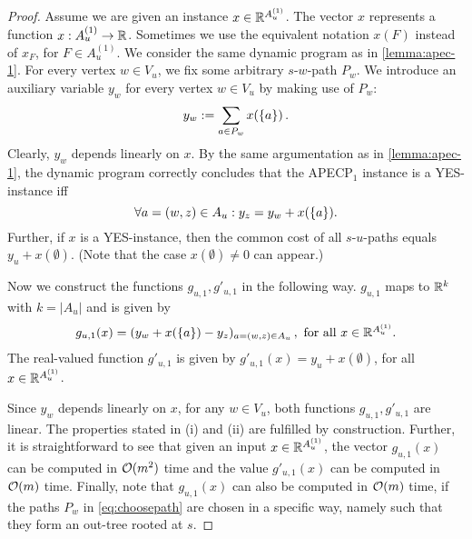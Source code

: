 \begin{proof}
    Assume we are given an instance $x \in \mathbb{R}^{A_u^{(1)}}$. The vector $x$ represents a function $x : A_u^{(1)} \rightarrow \mathbb{R}$. Sometimes we use the equivalent notation   $x(F)$ instead of $x_F$,  for $F\in A_u^{(1)}$. 
    We consider the same dynamic program as in \cref{lemma:apec-1}. For every vertex $w \in V_u$, we fix some arbitrary $s$-$w$-path $P_w$.
    We introduce an auxiliary  variable $y_w$ for every vertex $w \in V_u$ by making use of $P_w$:
    \begin{equation} 
    \label{eq:choosepath} y_w := \sum_{a \in P_w}x(\{ a \})\, .\end{equation}
    Clearly,  $y_w$ depends  linearly on $x$. By the same argumentation as in \cref{lemma:apec-1}, the dynamic program correctly concludes that the APECP$_1$ instance is a YES-instance iff
    \[\forall a = (w,z) \in A_u : y_z = y_w + x(\{ a \}). \]
    Further, if $x$ is  a YES-instance, then the common cost of all $s$-$u$-paths  equals $y_u + x(\emptyset)$. (Note that  the case $x(\emptyset) \neq 0$ can appear.)

    Now we construct the functions $g_{u,1}, g'_{u,1}$ in the following way. $g_{u,1}$ maps to $\mathbb{R}^k$ with $k = |A_u|$ and is given by
    \[ g_{u,1}(x) = ( y_w + x(\{ a \}) - y_z)_{a = (w,z) \in A_u}\, ,\mbox{ for all $x\in \mathbb{R}^{A_u^{(1)}}$} .\]
    The real-valued function $g'_{u,1}$ is given by $g'_{u,1}(x) = y_u + x(\emptyset)$, for all $x\in \mathbb{R}^{A_u^{(1)}}$.
    
    Since $y_w$ depends  linearly on $x$, for any $w\in V_u$, both  functions  $g_{u,1}, g'_{u,1}$  are linear. The  properties stated in  (i) and (ii) are fulfilled  by construction. Further, it is straightforward to see that given an input $x \in \mathbb{R}^{A_u^{(1)}}$, the vector $g_{u,1}(x)$ can be computed in $\mathcal{O}(m^2)$ time and the value $g'_{u,1}(x)$ can be computed in $\mathcal{O}(m)$ time. Finally, note that $g_{u,1}(x)$ can also be computed  in $\mathcal{O}(m)$ time, if  the paths $P_w$ in \cref{eq:choosepath} are chosen in a specific way, namely such that  they    form an out-tree rooted at $s$.  
\end{proof}
%
